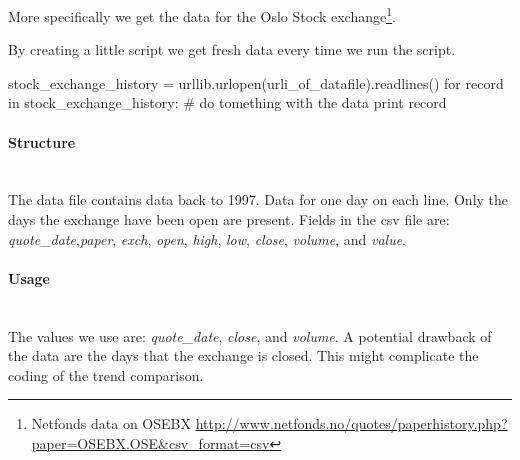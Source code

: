 More specifically we get the data for the Oslo Stock exchange\footnote{Netfonds
data on OSEBX
\url{http://www.netfonds.no/quotes/paperhistory.php?paper=OSEBX.OSE&csv_format=csv}}. 

By creating a little script we get fresh data every time we run the script.
\begin{python}
stock_exchange_history = urllib.urlopen(urli_of_datafile).readlines()
    for record in stock_exchange_history:
        # do tomething with the data
        print record
\end{python} 

\paragraph{Structure}
\hspace{0pt}\\
The data file contains data back to 1997. Data for one day on each line. Only
the days the exchange have been open are present.
Fields in the csv file are: \textit{quote\_date},\textit{paper},
\textit{exch}, \textit{open}, \textit{high}, \textit{low}, \textit{close},
\textit{volume}, and \textit{value}.

\paragraph{Usage}
\hspace{0pt}\\
The values we use are: \textit{quote\_date}, \textit{close}, and
\textit{volume}.
A potential drawback of the data are the days that the exchange is closed. This
might complicate the coding of the trend comparison.
%

